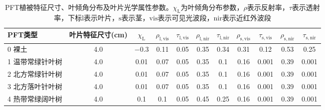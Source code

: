 \begin{landscape}
  \begin{table}[htbp]
    \centering
    \caption[PFT植被特征尺寸、叶倾角分布及叶片光学属性参数]{PFT植被特征尺寸、叶倾角分布及叶片光学属性参数。$\chi_{\mathrm {L}} $为叶倾角分布参数，$\rho$表示反射率，$\tau$表示透射率，下标${\mathrm {l}}$表示叶片，${\mathrm {s}}$表示茎，${\mathrm {vis}}$表示可见光波段，${\mathrm {nir}}$表示近红外波段}
    \label{tab:PFT植被特征尺寸叶倾角分布及叶片光学属性参数1}
    \begin{tabular}{@{}lcccccccccc@{}}
      \toprule
      PFT类型             & 叶片特征尺寸(cm) & $\chi_{\mathrm {L}} $ & $\rho_{\mathrm{l, vis}}$ & $\tau_{\mathrm{l, vis}}$ & $\rho_{\mathrm{l, nir}}$ & $\tau_{\mathrm{l, nir}}$ & $\rho_{\mathrm{s, vis}}$ & $\tau_{\mathrm{s, vis}}$ & $\rho_{\mathrm{s, nir}}$ & $\tau_{\mathrm{s,nir}}$ \\ \midrule
      0 裸土              & 4.0              & \num { -0.3 }         & 0.11                     & 0.05                     & 0.35                     & 0.34                     & 0.31                     & 0.12                     & 0.53                     & 0.25                    \\
      1 温带常绿针叶树    & 4.0              & 0.01                  & 0.07                     & 0.05                     & 0.35                     & 0.1                      & 0.16                     & 0.001                    & 0.39                     & 0.001                   \\
      2 北方常绿针叶树    & 4.0              & 0.01                  & 0.07                     & 0.05                     & 0.35                     & 0.1                      & 0.16                     & 0.001                    & 0.39                     & 0.001                   \\
      3 北方落叶针叶树    & 4.0              & 0.01                  & 0.07                     & 0.05                     & 0.35                     & 0.1                      & 0.16                     & 0.001                    & 0.39                     & 0.001                   \\
      4 热带常绿阔叶树    & 4.0              & 0.1                   & 0.1                      & 0.05                     & 0.45                     & 0.25                     & 0.16                     & 0.001                    & 0.39                     & 0.001                   \\

\end{tabular}
\end{table}
\end{landscape}
